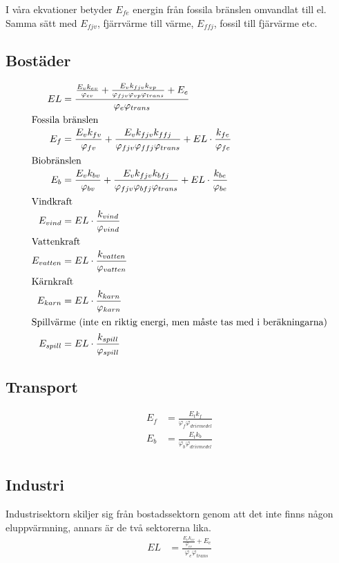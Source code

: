 \documentclass[a4paper,11pt,fleqn, titlepage]{article}
\begin{document}
I våra ekvationer betyder $E_{fe}$ energin från fossila bränslen omvandlat
till el. Samma sätt med $E_{fjv}$, fjärrvärme till värme, $E_{ffj}$, fossil
till fjärvärme etc.

\newpage

\subsection{Bostäder}
\begin{align*}
	EL &= \frac{\frac{E_v k_{ev}}{\varphi_{ev}} + \frac{E_v k_{fjv}
	k_{vp}}{\varphi_{fjv} \varphi_{vp} \varphi_{trans}} +
	E_e}{\varphi_e \varphi_{trans}} \\
\intertext{Fossila bränslen}
	E_f &= \frac{E_v k_{fv}}{\varphi_{fv}} + \frac{E_v k_{fjv}
	k_{ffj}}{\varphi_{fjv} \varphi_{ffj} \varphi_{trans}} + EL
	\cdot \frac{k_{fe}}{\varphi_{fe}} \\
\intertext{Biobränslen}
	E_b &= \frac{E_v k_{bv}}{\varphi_{bv}} + \frac{E_v k_{fjv}
	k_{bfj}}{\varphi_{fjv} \varphi_{bfj} \varphi_{trans}} + EL
	\cdot \frac{k_{be}}{\varphi_{be}} \\
\intertext{Vindkraft}
	E_{vind} &= EL \cdot \frac{k_{vind}}{\varphi_{vind}} \\
\intertext{Vattenkraft}
	E_{vatten} &= EL \cdot \frac{k_{vatten}}{\varphi_{vatten}} \\
\intertext{Kärnkraft}
	E_{karn} &= EL \cdot \frac{k_{karn}}{\varphi_{karn}} \\
\intertext{Spillvärme (inte en riktig energi, men måste tas med i beräkningarna)}
	E_{spill} &= EL \cdot \frac{k_{spill}}{\varphi_{spill}} \\
\end{align*}


\subsection{Transport}
\begin{align*}
	E_f &= \frac{E_t k_f}{\varphi_f \varphi_{drivmedel}} \\
	E_b &= \frac{E_t k_b}{\varphi_b \varphi_{drivmedel}} \\
\end{align*}


\subsection{Industri}
Industrisektorn skiljer sig från bostadssektorn genom att det inte finns
någon eluppvärmning, annars är de två sektorerna lika.
\begin{align*}
	EL &= \frac{\frac{E_v k_{ev}}{\varphi_{ev}} + E_e}{\varphi_e
	\varphi_{trans}} \\
\end{align*}
\end{document}

